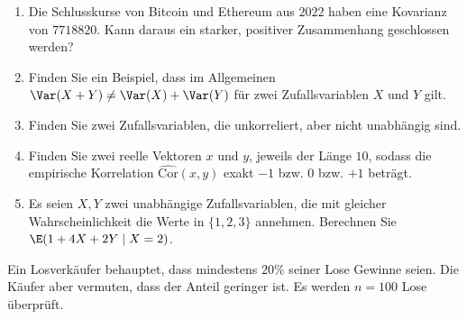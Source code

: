 

\begin{enumerate}

\item Die Schlusskurse von Bitcoin und Ethereum aus $2022$ haben eine Kovarianz von $7718820$. Kann daraus ein starker, positiver Zusammenhang geschlossen werden?


\item Finden Sie ein Beispiel, dass im Allgemeinen $\Var (X + Y) \neq \Var (X) + \Var (Y)$ für zwei Zufallsvariablen $X$ und $Y$ gilt.


\item Finden Sie zwei Zufallsvariablen, die unkorreliert, aber nicht unabhängig sind.


\item Finden Sie zwei reelle Vektoren $x$ und $y$, jeweils der Länge $10$, sodass die empirische Korrelation $\widehat{\text{Cor}} (x,y)$ exakt $-1$ bzw. $0$ bzw. $+1$ beträgt.


\item Es seien $X,Y$ zwei unabhängige Zufallsvariablen, die mit gleicher Wahrscheinlichkeit die Werte in $\{1, 2, 3\}$ annehmen. Berechnen Sie $\E (1 + 4X + 2Y \mid X = 2)$.

    
\end{enumerate}


Ein Losverkäufer behauptet, dass mindestens $20\%$ seiner Lose Gewinne seien. Die Käufer aber vermuten, dass der Anteil geringer ist. Es werden $n = 100$ Lose überprüft. 

